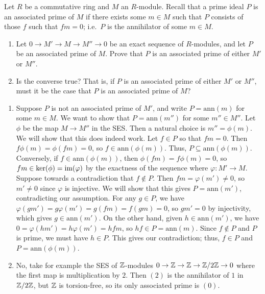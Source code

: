 %
\begin{question}[subtitle=August 2014 Problem 4,ID=Aug14_4]
Let $R$ be a commutative ring and $M$ an $R$-module. Recall that a prime ideal $P$ is an associated prime of $M$ if there exists some $m \in M$ such that $P$ consists of those $f$ such that $fm = 0$; i.e.\ $P$ is the annihilator of some $m \in M$.
\begin{enumerate}
    \item Let $0 \to M' \to M \to M'' \to 0$ be an exact sequence of $R$-modules, and let $P$ be an associated prime of $M$. Prove that $P$ is an associated prime of either $M'$ or $M''$.
    \item Is the converse true? That is, if $P$ is an associated prime of either $M'$ or $M''$, must it be the case that $P$ is an associated prime of $M$?
\end{enumerate}
\end{question}
\begin{solution}
\begin{enumerate}
    \item Suppose $P$ is not an associated prime of $M'$, and write $P=\text{ann}(m)$ for some $m \in M$. We want to show that $P = \text{ann}(m'')$ for some $m'' \in M''$. Let $\phi$ be the map $M \to M''$ in the SES. Then a natural choice is $m''=\phi(m)$. We will show that this does indeed work. Let $f \in P$ so that $fm=0$. Then $f \phi(m) = \phi(fm)=0$, so $f \in \text{ann}(\phi(m))$. Thus, $P \subseteq \text{ann}(\phi(m))$. Conversely, if $f \in \text{ann}(\phi(m))$, then $\phi(fm)=f\phi(m)=0$, so $fm \in \ker(\phi) = \operatorname{im}(\varphi)$ by the exactness of the sequence where $\varphi: M' \to M$. Suppose towards a contradiction that $f \notin P$. Then $fm =\varphi(m')\neq 0$, so $m' \neq 0$ since $\varphi$ is injective. We will show that this gives $P = \text{ann}(m')$, contradicting our assumption. For any $g \in P$, we have $\varphi(gm')=g\varphi(m')=g(fm)=f(gm)=0$, so $gm'=0$ by injectivity, which gives $g \in \text{ann}(m')$. On the other hand, given $h \in \text{ann}(m')$, we have $0 = \varphi(hm') = h\varphi(m')=hfm$, so $hf \in P = \text{ann}(m)$. Since $f \notin P$ and $P$ is prime, we must have $h \in P$. This gives our contradiction; thus, $f \in P$ and $P = \text{ann}(\phi(m))$.
    
    \item No, take for example the SES of $\mathbb{Z}$-modules $0 \to \mathbb{Z} \to \mathbb{Z} \to \mathbb{Z}/2\mathbb{Z} \to 0$ where the first map is multiplication by $2$. Then $(2)$ is the annihilator of $1$ in $\mathbb{Z}/2\mathbb{Z}$, but $\mathbb{Z}$ is torsion-free, so its only associated prime is $(0)$.
\end{enumerate}
\end{solution}

